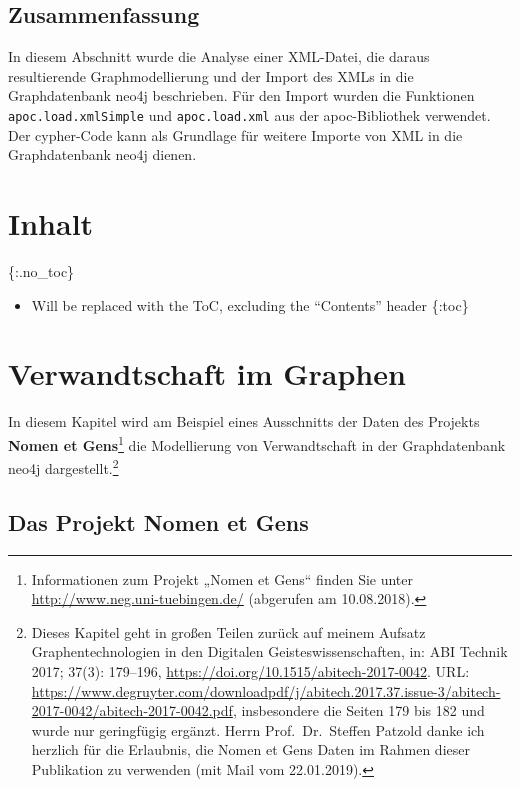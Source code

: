 \documentclass[ngerman,]{scrreprt}
\providecommand{\tightlist}{%
  \setlength{\itemsep}{0pt}\setlength{\parskip}{0pt}}
\begin{document}
\section{Zusammenfassung}\label{zusammenfassung-3}

In diesem Abschnitt wurde die Analyse einer XML-Datei, die daraus resultierende Graphmodellierung und der Import des XMLs in die Graphdatenbank neo4j beschrieben. Für den Import wurden die Funktionen \texttt{apoc.load.xmlSimple} und \texttt{apoc.load.xml} aus der apoc-Bibliothek verwendet. Der cypher-Code kann als Grundlage für weitere Importe von XML in die Graphdatenbank neo4j dienen.

\chapter{Inhalt}\label{inhalt-5}

\{:.no\_toc\}

\begin{itemize}
\tightlist
\item
  Will be replaced with the ToC, excluding the ``Contents'' header \{:toc\}
\end{itemize}

\chapter{Verwandtschaft im Graphen}\label{verwandtschaft-im-graphen}

In diesem Kapitel wird am Beispiel eines Ausschnitts der Daten des Projekts \textbf{Nomen et Gens}\footnote{Informationen zum Projekt „Nomen et Gens`` finden Sie unter \url{http://www.neg.uni-tuebingen.de/} (abgerufen am 10.08.2018).} die Modellierung von Verwandtschaft in der Graphdatenbank neo4j dargestellt.\footnote{Dieses Kapitel geht in großen Teilen zurück auf meinem Aufsatz Graphentechnologien in den Digitalen Geisteswissenschaften, in: ABI Technik 2017; 37(3): 179--196, \url{https://doi.org/10.1515/abitech-2017-0042}. URL: \url{https://www.degruyter.com/downloadpdf/j/abitech.2017.37.issue-3/abitech-2017-0042/abitech-2017-0042.pdf}, insbesondere die Seiten 179 bis 182 und wurde nur geringfügig ergänzt. Herrn Prof.~Dr.~Steffen Patzold danke ich herzlich für die Erlaubnis, die Nomen et Gens Daten im Rahmen dieser Publikation zu verwenden (mit Mail vom 22.01.2019).}

\section{Das Projekt Nomen et Gens}\label{das-projekt-nomen-et-gens}
\end{document}
